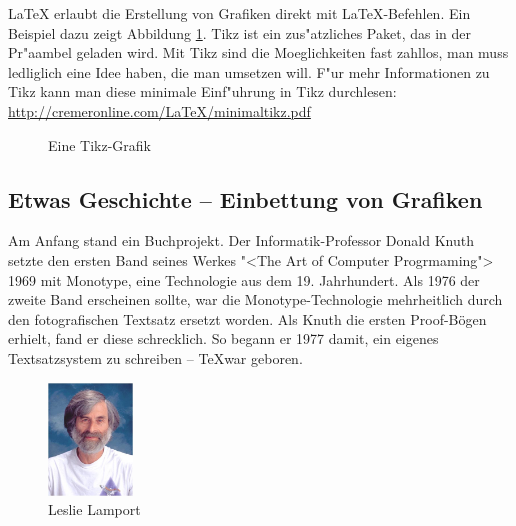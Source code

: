 \documentclass[11pt, a4paper]{article}
\newcommand{\ltx}{\LaTeX}
\begin{document}
\ltx{} erlaubt die Erstellung von Grafiken direkt mit \ltx-Befehlen. Ein Beispiel dazu zeigt Abbildung \ref{fig:tikz}. Tikz ist ein zus"atzliches Paket, das in der Pr"aambel geladen wird.
Mit Tikz sind die Moeglichkeiten fast zahllos, man muss ledliglich eine Idee haben, die man umsetzen will. F"ur mehr Informationen zu Tikz kann man diese minimale Einf"uhrung in Tikz durchlesen:
\url{http://cremeronline.com/LaTeX/minimaltikz.pdf}
%
\begin{figure}[t]
\centering
{}
\caption{Eine Tikz-Grafik\label{fig:tikz}}
\end{figure}


\subsection{Etwas Geschichte -- Einbettung von Grafiken}
Am Anfang stand ein Buchprojekt. Der Informatik-Professor Donald Knuth setzte den ersten Band seines Werkes "<The Art of Computer Progrmaming"> 1969 mit Monotype, eine Technologie aus dem 19. Jahrhundert. Als 1976 der zweite Band erscheinen sollte, war die Monotype-Technologie mehrheitlich durch den fotografischen Textsatz ersetzt worden. Als Knuth die ersten Proof-Bögen erhielt, fand er diese schrecklich. So begann er 1977 damit, ein eigenes Textsatzsystem zu schreiben -- \TeX war geboren.

\begin{figure}[htb]
\centering
\includegraphics[width=0.2\textwidth]{Leslie_Lamportd}
\caption{Leslie Lamport\label{fig:LL}}
\end{figure}
\end{document}
